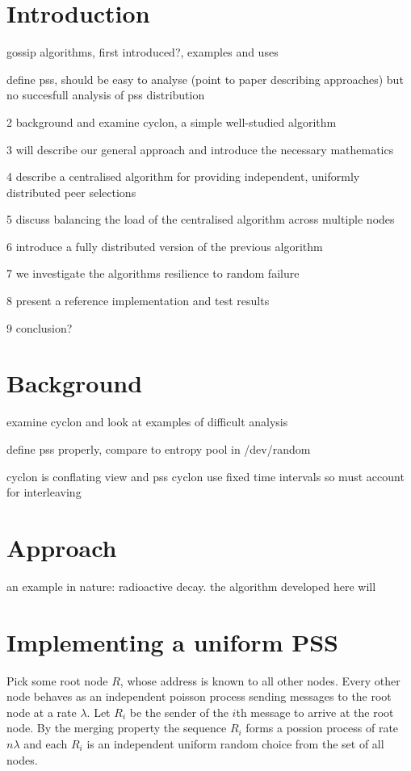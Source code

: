 \documentclass[a4paper,10pt]{article}
\date{2010-08-23}
\begin{document}
\section{Introduction}

gossip algorithms, first introduced?, examples and uses

define pss, should be easy to analyse (point to paper describing approaches) but no succesfull analysis of pss distribution

2 background and examine cyclon, a simple well-studied algorithm

3 will describe our general approach and introduce the necessary mathematics

4 describe a centralised algorithm for providing independent, uniformly distributed peer selections

5 discuss balancing the load of the centralised algorithm across multiple nodes

6 introduce a fully distributed version of the previous algorithm

7 we investigate the algorithms resilience to random failure

8 present a reference implementation and test results

9 conclusion?

\section{Background}

examine cyclon and look at examples of difficult analysis

define pss properly, compare to entropy pool in /dev/random

cyclon is conflating view and pss
cyclon use fixed time intervals so must account for interleaving

\section{Approach}

an example in nature: radioactive decay. the algorithm developed here will 

\section{Implementing a uniform PSS}

Pick some root node $R$, whose address is known to all other nodes. Every other node behaves as an independent poisson process sending messages to the root node at a rate $\lambda$. Let $R_i$ be the sender of the $i$th message to arrive at the root node. By the merging property the sequence $R_i$ forms a possion process of rate $n \lambda$ and each $R_i$ is an independent uniform random choice from the set of all nodes.
\end{document}
